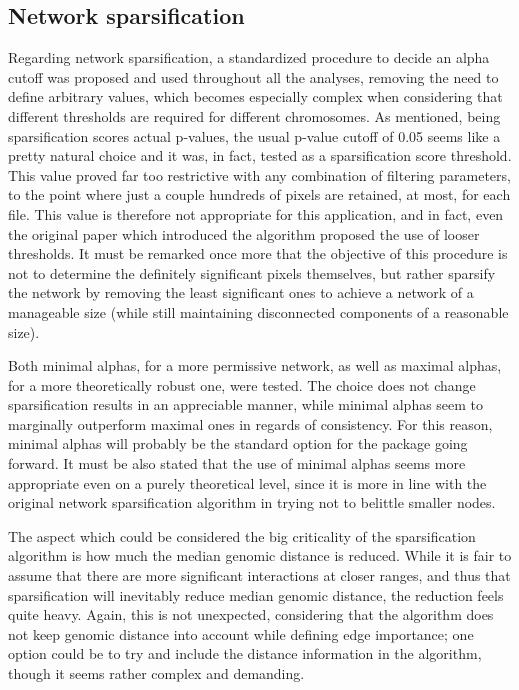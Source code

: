 \subsection{Network sparsification}
Regarding network sparsification, a standardized procedure to decide an alpha cutoff was proposed and used throughout all the analyses, removing the need to define arbitrary values, which becomes especially complex when considering that different thresholds are required for different chromosomes. As mentioned, being sparsification scores actual p-values, the usual p-value cutoff of 0.05 seems like a pretty natural choice and it was, in fact, tested as a sparsification score threshold. This value proved far too restrictive with any combination of filtering parameters, to the point where just a couple hundreds of pixels are retained, at most, for each file. This value is therefore not appropriate for this application, and in fact, even the original paper which introduced the algorithm proposed the use of looser thresholds. It must be remarked once more that the objective of this procedure is not to determine the definitely significant pixels themselves, but rather sparsify the network by removing the least significant ones to achieve a network of a manageable size (while still maintaining disconnected components of a reasonable size). 

Both minimal alphas, for a more permissive network, as well as maximal alphas, for a more theoretically robust one, were tested. The choice does not change sparsification results in an appreciable manner, while minimal alphas seem to marginally outperform maximal ones in regards of consistency. For this reason, minimal alphas will probably be the standard option for the package going forward. It must be also stated that the use of minimal alphas seems more appropriate even on a purely theoretical level, since it is more in line with the original network sparsification algorithm in trying not to belittle smaller nodes. 

The aspect which could be considered the big criticality of the sparsification algorithm is how much the median genomic distance is reduced. While it is fair to assume that there are more significant interactions at closer ranges, and thus that sparsification will inevitably reduce median genomic distance, the reduction feels quite heavy. Again, this is not unexpected, considering that the algorithm does not keep genomic distance into account while defining edge importance; one option could be to try and include the distance information in the algorithm, though it seems rather complex and demanding.


